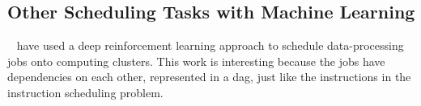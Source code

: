 \subsection{Other Scheduling Tasks with Machine Learning}
\citeauthor{mao2019learning}~\cite{mao2019learning} have used a deep reinforcement learning approach to schedule data-processing jobs onto computing clusters.
This work is interesting because the jobs have dependencies on each other, represented in a \ac{dag}, just like the instructions in the instruction scheduling problem.
